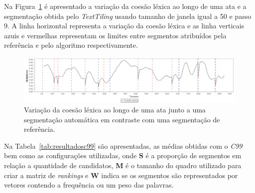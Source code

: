 Na Figura~\ref{fig:coesaolexicaTT} é apresentado a variação da coesão léxica ao longo de uma ata e a segmentação obtida pelo \textit{TextTiling} usando tamanho de janela igual a 50 e passo 9. A linha horizontal representa a variação da coesão léxica e as linha verticais azuis e vermelhas representam os limites entre segmentos atribuídos pela referência e pelo algoritmo respectivamente. 





  \begin{figure}[!h]
	  \centering
	  \includegraphics[width=\textwidth]{conteudo/capitulos/figs/coesaolexicaTT-50-9.png}
	  \caption{Variação da coesão léxica ao longo de uma ata junto a uma segmentação automática em contraste com uma segmentação de referência.}
	  \label{fig:coesaolexicaTT}
  \end{figure}




Na Tabela~\ref{tab:resultadosc99} são apresentadas, as médias obtidas com o \textit{C99} bem como as configurações utilizadas, onde \textbf{S} é a proporção de segmentos em relação a quantidade de candidatos, \textbf{M} é o tamanho do quadro utilizado para criar a matriz de \textit{rankings} e \textbf{W} indica se os segmentos são representados por vetores contendo a frequência ou um peso das palavras.


